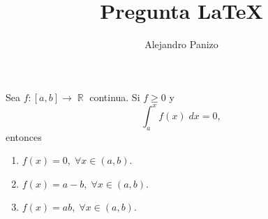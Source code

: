\documentclass[10pt,spanish,hyperref={pdfpagelabels=false}]{beamer}
\author{Alejandro Panizo}
\title{Pregunta \LaTeX}
\DeclareMathOperator{\RR}{\mathbb{R}}
\begin{document}
\Large

\rightskip=0pt

\begin{frame}

Sea $f:[a,b]\to \RR$ continua. Si $f\geq 0 $ y
$$\int _a^xf(x)\; dx=0, $$ entonces

\begin{enumerate}[1.] \rightskip=0pt
\item $f(x)=0, \; \forall x\in (a,b)$.
\item $f(x)=a-b, \; \forall x\in (a,b)$.
\item $f(x)=ab, \; \forall x\in (a,b)$.
\end{enumerate}


\end{frame}
\end{document}
